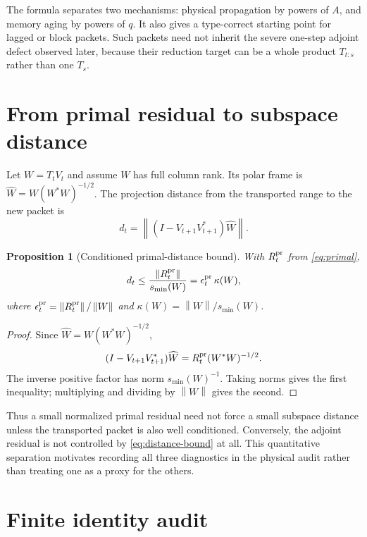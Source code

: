 \documentclass[12pt]{article}
\newtheorem{proposition}[theorem]{Proposition}
\theoremstyle{definition}
\theoremstyle{remark}
\newcommand{\norm}[1]{\left\lVert#1\right\rVert}
\begin{document}
The formula separates two mechanisms: physical propagation by powers of
$A$, and memory aging by powers of $q$.  It also gives a type-correct starting
point for lagged or block packets.  Such packets need not inherit the severe
one-step adjoint defect observed later, because their reduction target can be
a whole product $T_{t:s}$ rather than one $T_s$.

\section{From primal residual to subspace distance}

Let $W=T_tV_t$ and assume $W$ has full column rank.  Its polar frame is
$\widehat W=W(W^*W)^{-1/2}$.  The projection distance from the transported
range to the new packet is
\[
 d_t=\norm{(I-V_{t+1}V_{t+1}^*)\widehat W}.
\]

\begin{proposition}[Conditioned primal-distance bound]\label{prop:distance}
With $R_t^{\rm pr}$ from \eqref{eq:primal},
\begin{equation}\label{eq:distance-bound}
 d_t\le
 \frac{\norm{R_t^{\rm pr}}}{s_{\min}(W)}
 =\epsilon_t^{\rm pr}\,\kappa(W),
\end{equation}
where
$\epsilon_t^{\rm pr}=\norm{R_t^{\rm pr}}/\norm W$ and
$\kappa(W)=\norm W/s_{\min}(W)$.
\end{proposition}

\begin{proof}
Since $\widehat W=W(W^*W)^{-1/2}$,
\[
 (I-V_{t+1}V_{t+1}^*)\widehat W
 =R_t^{\rm pr}(W^*W)^{-1/2}.
\]
The inverse positive factor has norm $s_{\min}(W)^{-1}$.  Taking norms gives
the first inequality; multiplying and dividing by $\norm W$ gives the second.
\end{proof}

Thus a small normalized primal residual need not force a small subspace
distance unless the transported packet is also well conditioned.  Conversely,
the adjoint residual is not controlled by \eqref{eq:distance-bound} at all.
This quantitative separation motivates recording all three diagnostics in
the physical audit rather than treating one as a proxy for the others.

\section{Finite identity audit}
\end{document}
